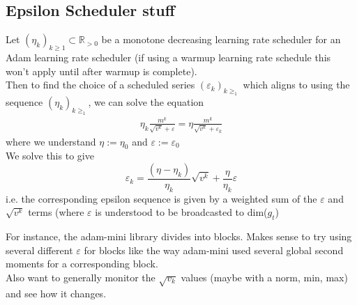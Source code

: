 \documentclass[12pt]{book}
\newcommand{\R}{\mathbb{R}}
\begin{document}
\subsection*{Epsilon Scheduler stuff}
Let $(\eta_{k})_{k\ge 1} \subset \R_{>0}$ be a monotone decreasing learning rate scheduler for an Adam learning rate scheduler (if using a warmup learning rate schedule this won't apply until after warmup is complete).\\

Then to find the choice of a scheduled series $(\varepsilon _{k})_{k\ge_1} $ which aligns to using the sequence $(\eta_{k})_{k\ge_1} $, we can solve the equation 
\begin{align*}
\eta_k \frac{m^{k}}{\sqrt{v^{k}} + \varepsilon } = \eta \frac{m^{k}}{\sqrt{v^{k}} + \varepsilon _k}
\end{align*}
where we understand $\eta := \eta_0$ and  $\varepsilon := \varepsilon _0$
\\
We solve this to give 
\[
\varepsilon _k = \frac{(\eta - \eta_k)}{\eta_k} \sqrt{v^{k}} + \frac{\eta}{\eta_k}\varepsilon 
\] 
i.e. the corresponding epsilon sequence is given by a weighted sum of the $\varepsilon $ and $\sqrt{v^{k}} $ terms (where $\varepsilon $ is understood to be broadcasted to dim($g_t$)

For instance, the adam-mini library divides into blocks. Makes sense to try using several different $\varepsilon $ for blocks like the way adam-mini used several global second moments for a corresponding block. 
\\
Also want to generally monitor the $\sqrt{v_k} $ values (maybe with a norm, min, max) and see how it changes. 
\end{document}
